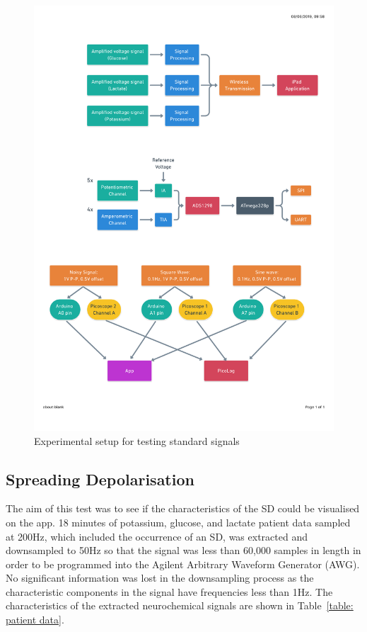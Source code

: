 \begin{figure}[h!]
\centering
\includegraphics[trim={0cm 0cm 0cm  0cm}, clip, width=.8\textwidth]{./figures/test1.pdf}
\captionsetup{justification=centering}
\caption{Experimental setup for testing standard signals}
\label{fig: test1}
\end{figure}


\subsection{Spreading Depolarisation}
The aim of this test was to see if the characteristics of the SD could be visualised on the app. 18 minutes of potassium, glucose, and lactate patient data sampled at 200Hz, which included the occurrence of an SD, was extracted and downsampled to 50Hz so that the signal was less than 60,000 samples in length in order to be programmed into the Agilent Arbitrary Waveform Generator (AWG). No significant information was lost in the downsampling process as the characteristic components in the signal have frequencies less than 1Hz. The characteristics of the extracted neurochemical signals are shown in Table~\ref{table: patient data}. 


